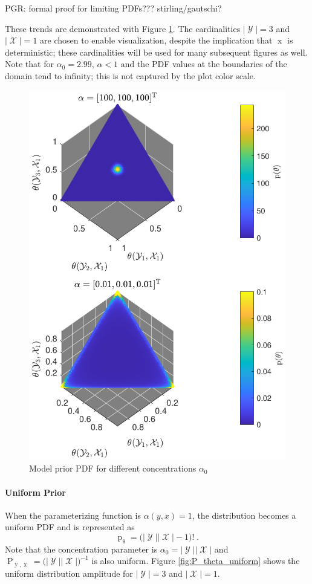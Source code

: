 \documentclass[12pt]{report}
\DeclareMathOperator{\xrm}{\mathrm{x}}
\DeclareMathOperator{\yrm}{\mathrm{y}}
\DeclareMathOperator{\Prm}{\mathrm{P}}
\DeclareMathOperator{\prm}{\mathrm{p}}
\DeclareMathOperator{\Xcal}{\mathcal{X}}
\DeclareMathOperator{\Ycal}{\mathcal{Y}}
\begin{document}
PGR: formal proof for limiting PDFs??? stirling/gautschi?

These trends are demonstrated with Figure \ref{fig:P_theta}. The cardinalities $|\Ycal| = 3$ and $|\Xcal| = 1$ are chosen to enable visualization, despite the implication that $\xrm$ is deterministic; these cardinalities will be used for many subsequent figures as well. Note that for $\alpha_0=2.99$, $\alpha < 1$ and the PDF values at the boundaries of the domain tend to infinity; this is not captured by the plot color scale.

\begin{figure}
\centering
\includegraphics[width=0.7\linewidth]{P_theta.pdf}
\caption{Model prior PDF for different concentrations $\alpha_0$}
\label{fig:P_theta}
\end{figure}





\paragraph{Uniform Prior}

When the parameterizing function is $\alpha(y,x) = 1$, the distribution becomes a uniform PDF and is represented as
\begin{equation}
\prm_{\uptheta} = \big( |\Ycal||\Xcal|-1 \big)! \;.
\end{equation}
Note that the concentration parameter is $\alpha_0 = |\Ycal||\Xcal|$ and $\Prm_{\yrm,\xrm} = \big( |\Ycal||\Xcal| \big)^{-1}$ is also uniform. Figure \ref{fig:P_theta_uniform} shows the uniform distribution amplitude for $|\Ycal| = 3$ and $|\Xcal| = 1$.
\end{document}
